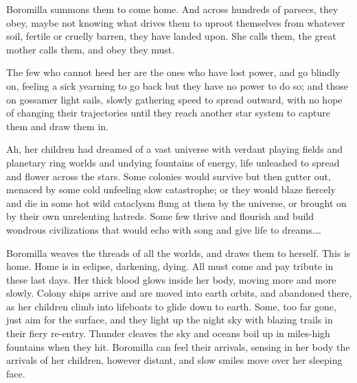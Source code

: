 Boromilla summons them to come home. And across hundreds of parsecs,
they obey, maybe not knowing what drives them to uproot themselves from
whatever soil, fertile or cruelly barren, they have landed upon. She
calls them, the great mother calls them, and obey they must.

The few who cannot heed her are the ones who have lost power, and go
blindly on, feeling a sick yearning to go back but they have no power to
do so; and those on gossamer light sails, slowly gathering speed to
spread outward, with no hope of changing their trajectories until they
reach another star system to capture them and draw them in.

Ah, her children had dreamed of a vast universe with verdant playing
fields and planetary ring worlds and undying fountains of energy, life
unleashed to spread and flower across the stars. Some colonies would
survive but then gutter out, menaced by some cold unfeeling slow
catastrophe; or they would blaze fiercely and die in some hot wild
cataclysm flung at them by the universe, or brought on by their own
unrelenting hatreds. Some few thrive and flourish and build wondrous
civilizations that would echo with song and give life to dreams.\ldots

Boromilla weaves the threads of all the worlds, and draws them to
herself. This is home. Home is in eclipse, darkening, dying. All must
come and pay tribute in these last days. Her thick blood glows inside
her body, moving more and more slowly. Colony ships arrive and are moved
into earth orbits, and abandoned there, as her children climb into
lifeboats to glide down to earth. Some, too far gone, just aim for the
surface, and they light up the night sky with blazing trails in their
fiery re-entry. Thunder cleaves the sky and oceans boil up in miles-high
fountains when they hit. Boromilla can feel their arrivals, sensing in
her body the arrivals of her children, however distant, and slow smiles
move over her sleeping face.

